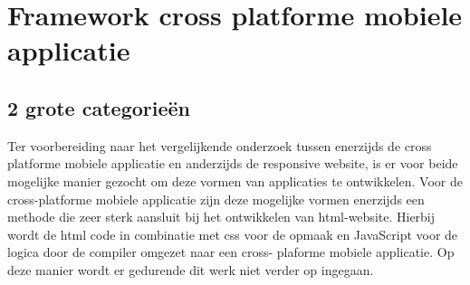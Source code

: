 \chapter{Framework cross platforme mobiele applicatie}
\label{ch:frameworkcrossplatformapp}
\section{2 grote categorieën}
Ter voorbereiding naar het vergelijkende onderzoek tussen enerzijds de cross platforme mobiele applicatie en anderzijds de
responsive website, is er voor beide mogelijke manier gezocht om deze vormen van applicaties te ontwikkelen. Voor de cross-platforme
mobiele applicatie zijn deze mogelijke vormen enerzijds een methode die zeer sterk aansluit bij het ontwikkelen van html-website.
Hierbij wordt de html code in combinatie met css voor de opmaak en JavaScript voor de logica door de compiler omgezet naar een cross-
plaforme mobiele applicatie. Op deze manier wordt er gedurende dit werk niet verder op ingegaan.

\section{}
